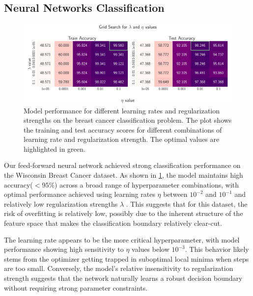 \clearpage


\onecolumngrid
\subsection{Neural Networks Classification}

\begin{figure}[h!]
    \centering
    \includegraphics[width = .9\textwidth]{../figs/classification_lambda_eta.pdf}
    \caption{Model performance for different learning rates and regularization strengths on the breast cancer classification problem. The plot shows the training and test accuracy scores for different combinations of learning rate and regularization strength. The optimal values are highlighted in green.}
    \label{fig:NN_Classification_lambda_eta}
\end{figure}
\twocolumngrid

Our feed-forward neural network achieved strong classification performance on the Wisconsin Breast Cancer dataset. As shown in \cref{fig:NN_Classification_lambda_eta}, the model maintains high accuracy($<95\%$) across a broad range of hyperparameter combinations, with optimal performance achieved using learning rates $\eta$ between $10^{-2}$ and $10^{-1}$ and relatively low regularization strengths $\lambda$ . This suggests that for this dataset, the risk of overfitting is relatively low, possibly due to the inherent structure of the feature space that makes the classification boundary relatively clear-cut.

The learning rate appears to be the more critical hyperparameter, with model performance showing high sensitivity to $\eta$ values below $10^{-3}$. This behavior likely stems from the optimizer getting trapped in suboptimal local minima when steps are too small. Conversely, the model's relative insensitivity to regularization strength suggests that the network naturally learns a robust decision boundary without requiring strong parameter constraints.


